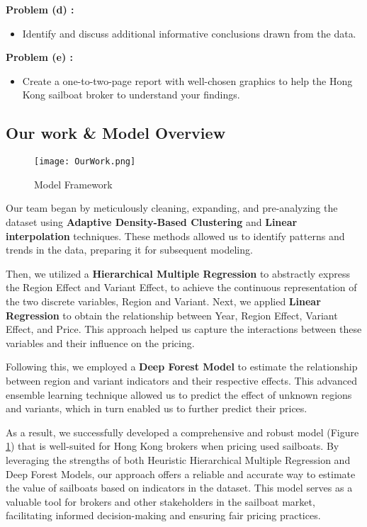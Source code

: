 \documentclass[12pt]{article}  %
\begin{document}
\textbf{Problem (d) :}
\begin{itemize}
    \item Identify and discuss additional informative conclusions drawn from the data.
\end{itemize}

\textbf{Problem (e) :}
\begin{itemize}
    \item Create a one-to-two-page report with well-chosen graphics to help the Hong Kong sailboat broker to understand your findings.
\end{itemize}
\subsection{Our work \& Model Overview}
\begin{figure}[htbp]
    \centering
    \texttt{[image: OurWork.png]}
    \caption{Model Framework}\label{fig:OurWork}
\end{figure}
Our team began by meticulously cleaning, expanding, and pre-analyzing the dataset using \textbf{Adaptive Density-Based Clustering} and \textbf{Linear interpolation} techniques. These methods allowed us to identify patterns and trends in the data, preparing it for subsequent modeling.

Then, we utilized a \textbf{Hierarchical Multiple Regression} to abstractly express the Region Effect and Variant Effect, to achieve the continuous representation of the two discrete variables, Region and Variant. Next, we applied \textbf{Linear Regression} to obtain the relationship between Year, Region Effect, Variant Effect, and Price. This approach helped us capture the interactions between these variables and their influence on the pricing.

Following this, we employed a \textbf{Deep Forest Model} to estimate the relationship between region and variant indicators and their respective effects. This advanced ensemble learning technique allowed us to predict the effect of unknown regions and variants, which in turn enabled us to further predict their prices.

As a result, we successfully developed a comprehensive and robust model (Figure \ref{fig:OurWork}) that is well-suited for Hong Kong brokers when pricing used sailboats. By leveraging the strengths of both Heuristic Hierarchical Multiple Regression and Deep Forest Models, our approach offers a reliable and accurate way to estimate the value of sailboats based on indicators in the dataset. This model serves as a valuable tool for brokers and other stakeholders in the sailboat market, facilitating informed decision-making and ensuring fair pricing practices.
\end{document}
